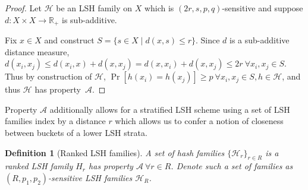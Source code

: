 \documentclass[a4paper]{article}
\theoremstyle{def}
\newtheorem{definition}{Definition}
\theoremstyle{thm}
\newtheorem{proposition}{Proposition}
\newcommand{\R}[0]{\mathbb{R}}
\newcommand{\LSH}[0]{\mathcal{H}}
\begin{document}
\begin{proof}
    Let $\LSH$ be an LSH family on $X$ which is $(2r, s, p, q)$-sensitive and suppose $d: X \times X \rightarrow \R_+$ is sub-additive.

    Fix $x \in X$ and construct $S = \{s \in X \mid d(x,s) \le r\}$.
    Since $d$ is a sub-additive distance measure, $d(x_i, x_j) \le d(x_i,x) + d(x,x_j) = d(x,x_i) + d(x,x_j) \le 2r~\forall x_i,x_j \in S$.
    Thus by construction of $\LSH$, $\Pr[h(x_i) = h(x_j)] \ge p~\forall x_i, x_j \in S, h \in \LSH$, and thus $\LSH$ has property~$\mathscr{A}$.
\end{proof}

Property $\mathscr{A}$ additionally allows for a stratified LSH scheme using a set of LSH families index by a distance $r$ which allows us to confer a notion of closeness between buckets of a lower LSH strata.

\begin{definition}[Ranked LSH families]\label{defn:ranked_lsh}
    A set of hash families ${\{{\LSH}_r\}}_{r\in R}$ is a ranked LSH family $H_r$ has property $\mathscr{A}~\forall r \in R$.
    Denote such a set of families as $(R,p_1, p_2)$-sensitive LSH families ${\LSH}_R$.
\end{definition}


\end{document}
